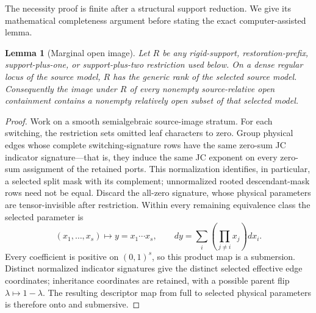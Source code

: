 \documentclass[11pt]{article}
\newtheorem{lemma}[theorem]{Lemma}
\theoremstyle{remark}
\begin{document}
The necessity proof is finite after a structural support reduction.  We give
its mathematical completeness argument before stating the exact
computer-assisted lemma.

\begin{lemma}[Marginal open image]\label{lem:marginal-open}
Let $R$ be any rigid-support, restoration-prefix, support-plus-one, or
support-plus-two restriction used below.  On a dense regular locus of the
source model, $R$ has the generic rank of the selected source model.
Consequently the image under $R$ of every nonempty source-relative open
containment contains a nonempty relatively open subset of that selected
model.
\end{lemma}

\begin{proof}
Work on a smooth semialgebraic source-image stratum.  For each switching,
the restriction sets omitted leaf characters to zero.  Group physical edges
whose complete switching-signature rows have the same zero-sum JC indicator
signature---that is, they induce the same JC exponent on every zero-sum
assignment of the retained ports.  This normalization identifies, in
particular, a selected split mask with its complement; unnormalized rooted
descendant-mask rows need not be equal.  Discard the all-zero signature,
whose physical parameters are tensor-invisible after restriction.  Within
every remaining equivalence class the selected parameter is
\[
(x_1,\ldots,x_s)\longmapsto y=x_1\cdots x_s,
\qquad
dy=\sum_i\left(\prod_{j\ne i}x_j\right)dx_i.
\]
Every coefficient is positive on $(0,1)^s$, so this product map is a
submersion.  Distinct normalized indicator signatures give the distinct
selected effective edge coordinates; inheritance coordinates are retained,
with a possible parent flip $\lambda\mapsto1-\lambda$.  The resulting
descriptor map from full to selected physical parameters is therefore onto
and submersive.


\end{proof}
\end{document}
